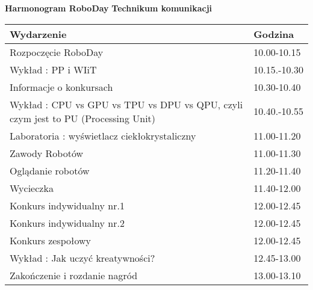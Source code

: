 \documentclass{article}
\begin{document}
\begin{center}
\Large\textbf{Harmonogram RoboDay}
\large\textbf{Technikum komunikacji}
\end{center}
\vspace{1cm}
\begin{center}
\begin{tabular}{|l|l|}
\hline
\textbf{Wydarzenie} & \textbf{Godzina} \\
\hline
Rozpoczęcie RoboDay & 10.00-10.15 \\
\hline
Wykład : PP i WIiT & 10.15.-10.30 \\
\hline
Informacje o konkursach & 10.30-10.40 \\
\hline
Wykład : CPU vs GPU vs TPU vs DPU vs QPU, czyli czym jest to PU (Processing Unit) & 10.40.-10.55 \\
\hline
Laboratoria : wyświetlacz ciekłokrystaliczny & 11.00-11.20 \\
\hline
Zawody Robotów & 11.00-11.30 \\
\hline
Oglądanie robotów & 11.20-11.40 \\
\hline
Wycieczka & 11.40-12.00 \\
\hline
Konkurs indywidualny nr.1 & 12.00-12.45 \\
\hline
Konkurs indywidualny nr.2 & 12.00-12.45 \\
\hline
Konkurs zespołowy & 12.00-12.45 \\
\hline
Wykład : Jak uczyć kreatywności? & 12.45-13.00 \\
\hline
Zakończenie i rozdanie nagród & 13.00-13.10 \\
\hline
\end{tabular}
\end{center}
\end{document}
